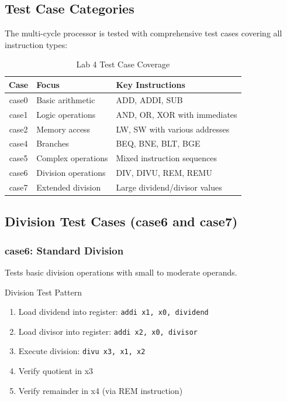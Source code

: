 \documentclass[a4paper, 11pt]{article}
\begin{document}
\subsection{Test Case Categories}

The multi-cycle processor is tested with comprehensive test cases covering all instruction types:

\begin{table}[H]
\centering
\caption{Lab 4 Test Case Coverage}
\begin{tabular}{|c|l|l|}
\hline
\textbf{Case} & \textbf{Focus} & \textbf{Key Instructions} \\
\hline
case0 & Basic arithmetic & ADD, ADDI, SUB \\
\hline
case1 & Logic operations & AND, OR, XOR with immediates \\
\hline
case2 & Memory access & LW, SW with various addresses \\
\hline
case4 & Branches & BEQ, BNE, BLT, BGE \\
\hline
case5 & Complex operations & Mixed instruction sequences \\
\hline
case6 & Division operations & DIV, DIVU, REM, REMU \\
\hline
case7 & Extended division & Large dividend/divisor values \\
\hline
\end{tabular}
\end{table}

\subsection{Division Test Cases (case6 and case7)}

\subsubsection{case6: Standard Division}
Tests basic division operations with small to moderate operands.

\begin{myblock}{Division Test Pattern}
\begin{enumerate}
    \item Load dividend into register: \texttt{addi x1, x0, dividend}
    \item Load divisor into register: \texttt{addi x2, x0, divisor}
    \item Execute division: \texttt{divu x3, x1, x2}
    \item Verify quotient in x3
    \item Verify remainder in x4 (via REM instruction)
\end{enumerate}
\end{myblock}
\end{document}
